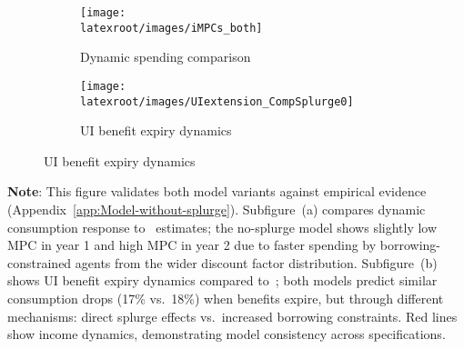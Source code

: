 \documentclass{econsocart}
\begin{document}
\begin{figure}[H]
  \centering
  \caption{Validation moments in models with and without splurge}
  \label{fig:untargetedMoments_wSplZero} 
  \noindent\begin{minipage}{\textwidth}
    \centering
    \begin{subfigure}[b]{.48\linewidth}
      \centering
      \texttt{[image: \\latexroot/images/iMPCs\_both]}
      \caption{Dynamic spending comparison}
      \label{fig:USaggmpclotterywin_wSplZero} 
    \end{subfigure}
    \begin{subfigure}[b]{.48\linewidth}
      \centering
      \texttt{[image: \\latexroot/images/UIextension\_CompSplurge0]}
      \caption{UI benefit expiry dynamics}
      \label{fig:expiryUI_wSplZero} 
    \end{subfigure}
  \end{minipage}
\end{figure}
\noindent\parbox{\textwidth}{\footnotesize
  \textbf{Note}: This figure validates both model variants against empirical evidence (Appendix~\ref{app:Model-without-splurge}).
  Subfigure~(a) compares dynamic consumption response to~\cite{fagereng-mpc-2021} estimates;
  the no-splurge model shows slightly low MPC in year 1 and high MPC in year 2 due to
  faster spending by borrowing-constrained agents from the wider discount factor distribution.
  Subfigure~(b) shows UI benefit expiry dynamics compared to~\cite{ganongConsumer2019};
  both models predict similar consumption drops (17\% vs.\ 18\%) when benefits expire,
  but through different mechanisms: direct splurge effects vs.\ increased borrowing constraints.
  Red lines show income dynamics, demonstrating model consistency across specifications.
}

\vspace{2em}  %
\end{document}

